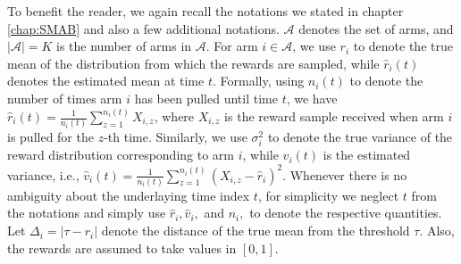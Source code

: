 To benefit the reader, we again recall the notations we stated in chapter \ref{chap:SMAB} and also a few additional notations. $\mathcal{A}$ denotes the set of arms, and $|\mathcal{A}|=K$ is the number of arms in $\mathcal{A}$. For arm $i\in\mathcal{A}$, we use $r_{i}$ to denote the true mean of the distribution from which the rewards are sampled, while $\hat{r}_{i}(t)$ denotes the estimated mean at time $t$. Formally, using $n_i(t)$ to denote the number of times arm $i$ has been pulled until time $t$, we have $\hat{r}_{i}(t)=\frac{1}{n_{i}(t)}\sum_{z=1}^{n_i(t)} X_{i,z}$, where $X_{i,z}$ is the reward sample received when arm $i$ is pulled for the $z$-th time. %
Similarly, we use $\sigma_{i}^{2}$ to denote the true variance of the reward distribution corresponding to arm $i$, while $\hat{v}_{i}(t)$ is the estimated variance, i.e., $\hat{v}_{i}(t)=\frac{1}{n_i(t)}\sum_{z=1}^{n_{i}(t)}(X_{i,z}-\hat{r}_{i})^{2}$. Whenever there is no ambiguity about the underlaying  time index $t$, for simplicity we neglect $t$ from the notations and simply use  $\hat{r}_i, \hat{v}_i,$ and $n_i, $ to denote the respective quantities.  Let  $\Delta_{i}=|\tau-r_{i}|$ denote the distance of the true mean from the threshold $\tau$. Also, the rewards are assumed to take values in $[0,1]$.


